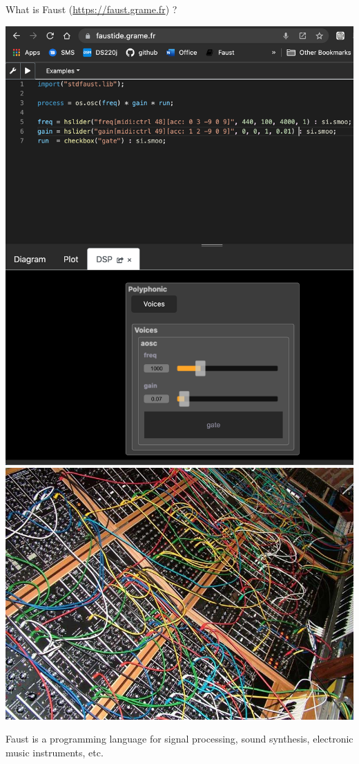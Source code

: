 
\begin{frame}[fragile]{What is Faust (\href{https://faust.grame.fr}{https://faust.grame.fr}) ?}
    \begin{center}
        \includegraphics[height=0.45\textheight]{images/faustide11.png}
        \includegraphics[height=0.45\textheight]{images/synth}    
    \end{center}

   Faust is a programming language for signal processing, sound synthesis, electronic music instruments, etc.
\end{frame}

